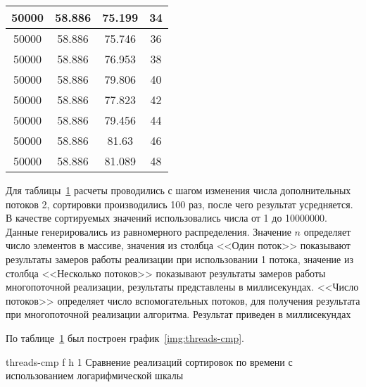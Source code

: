 \begin{table}[ht]
\begin{tabular}{|c|c|c|c|}
	50000 & 58.886                  & 75.199                            & 34          \\ \hline
	50000 & 58.886                  & 75.746                            & 36          \\ \hline
	50000 & 58.886                  & 76.953                            & 38          \\ \hline
	50000 & 58.886                  & 79.806                            & 40          \\ \hline
	50000 & 58.886                  & 77.823                            & 42          \\ \hline
	50000 & 58.886                  & 79.456                            & 44          \\ \hline
	50000 & 58.886                  & 81.63                             & 46          \\ \hline
	50000 & 58.886                  & 81.089                            & 48          \\ \hline
	\end{tabular}
	\label{t:timings}
\end{table}
Для таблицы~\ref{t:timings} расчеты проводились с шагом изменения числа дополнительных потоков 2, сортировки производились 100 раз, после чего результат усредняется. В качестве сортируемых значений использовались  числа от 1 до 10000000. Данные генерировались из равномерного распределения.
Значение $n$ определяет число элементов в массиве, значения из столбца <<Один поток>> показывают результаты замеров  работы реализации при использовании 1 потока, значение  из столбца <<Несколько потоков>> показывают результаты замеров работы многопоточной реализации, результаты представлены в миллисекундах. <<Число потоков>> определяет число вспомогательных потоков, для получения результата при многопоточной реализации алгоритма. Результат приведен в миллисекундах


По таблице~\ref{t:timings} был построен график~\ref{img:threads-cmp}. 

{threads-cmp} %
{f} %
{h} %
{1\textwidth} %
{Сравнение реализаций сортировок по времени с использованием логарифмической шкалы} %










